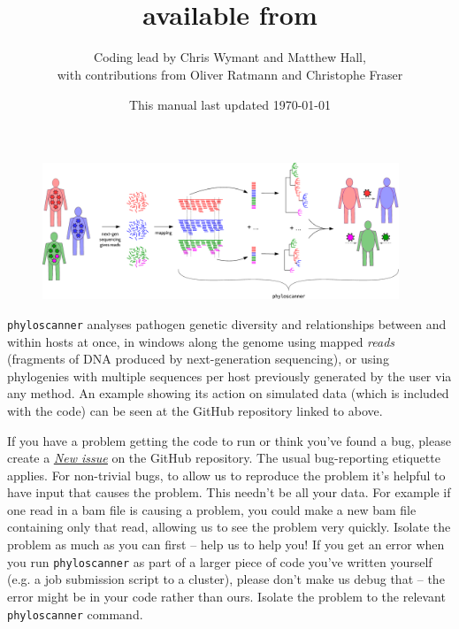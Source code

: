 \documentclass{article}
\title{\p\\available from \href{https://github.com/BDI-pathogens/phyloscanner}{\www{github.com/BDI-pathogens/phyloscanner}}}
\date{This manual last updated \today}
\author{Coding lead by Chris Wymant and Matthew Hall,\\with contributions from Oliver Ratmann and Christophe Fraser}
\newcommand{\p}{\texttt{phyloscanner}\xspace}
\newcommand{\www}{\color{blue} \underline}
\begin{document}
\maketitle


\begin{figure}[!h]
\centering
\includegraphics[width=0.95\textwidth]{PhyloscannerDiagram_big4.pdf}
\end{figure}

\vspace*{6mm}

\p analyses pathogen genetic diversity and relationships between and within hosts at once, in windows along the genome using mapped {\it reads} (fragments of DNA produced by next-generation sequencing), or using phylogenies with multiple sequences per host previously generated by the user via any method.
An example showing its action on simulated data (which is included with the code) can be seen at the GitHub repository linked to above.

\vspace*{6mm}

If you have a problem getting the code to run or think you've found a bug, please create a \href{https://github.com/BDI-pathogens/phyloscanner/issues}{\www{\it New issue}} on the GitHub repository.
The usual bug-reporting etiquette applies.
For non-trivial bugs, to allow us to reproduce the problem it's helpful to have input that causes the problem.
This needn't be all your data.
For example if one read in a bam file is causing a problem, you could make a new bam file containing only that read, allowing us to see the problem very quickly.
Isolate the problem as much as you can first -- help us to help you!
If you get an error when you run \p as part of a larger piece of code you've written yourself (e.g. a job submission script to a cluster), please don't make us debug that -- the error might be in your code rather than ours.
Isolate the problem to the relevant \p command.

\vspace*{6mm}
\end{document}
